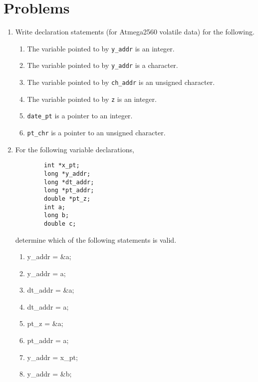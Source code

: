\section*{Problems}
\begin{enumerate}
    \item Write declaration statements (for Atmega2560 volatile data) for the following.
    \begin{enumerate}
        \item The variable pointed to by \texttt{y\_addr} is an integer.
        \item The variable pointed to by \texttt{y\_addr} is a character.
        \item The variable pointed to by \texttt{ch\_addr} is an unsigned character.
        \item The variable pointed to by \texttt{z} is an integer.
        \item \texttt{date\_pt} is a pointer to an integer.
        \item \texttt{pt\_chr} is a pointer to an unsigned character.
    \end{enumerate}
    \item For the following variable declarations, 
        \begin{verbatim}
        int *x_pt; 
        long *y_addr; 
        long *dt_addr;
        long *pt_addr;
        double *pt_z; 
        int a; 
        long b; 
        double c;
        \end{verbatim}

    determine which of the following statements is valid.
    \begin{enumerate}
        \item y\_addr = \&a;
        
        \item y\_addr = a;
        
        \item dt\_addr = \&a;
        
        \item dt\_addr = a;
        
        \item pt\_z = \&a;
        
        \item pt\_addr = a;
        
        \item y\_addr = x\_pt;
        
        \item y\_addr = \&b;
        

\end{enumerate}
\end{enumerate}
